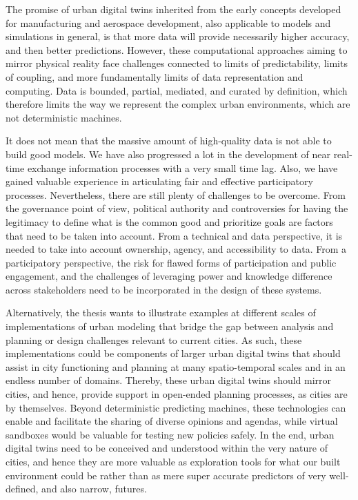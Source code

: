 The promise of urban digital twins inherited from the early concepts developed for manufacturing and aerospace development, also applicable to models and simulations in general, is that more data will provide necessarily higher accuracy, and then better predictions. However, these computational approaches aiming to mirror physical reality face challenges connected to limits of predictability, limits of coupling, and more fundamentally limits of data representation and computing. Data is bounded, partial, mediated, and curated by definition, which therefore limits the way we represent the complex urban environments, which are not deterministic machines.

It does not mean that the massive amount of high-quality data is not able to build good models. We have also progressed a lot in the development of near real-time exchange information processes with a very small time lag. Also, we have gained valuable experience in articulating fair and effective participatory processes. Nevertheless, there are still plenty of challenges to be overcome. From the governance point of view, political authority and controversies for having the legitimacy to define what is the common good and prioritize goals are factors that need to be taken into account. From a technical and data perspective, it is needed to take into account ownership, agency, and accessibility to data. From a participatory perspective, the risk for flawed forms of participation and public engagement, and the challenges of leveraging power and knowledge difference across stakeholders need to be incorporated in the design of these systems.

Alternatively, the thesis wants to illustrate examples at different scales of implementations of urban modeling that bridge the gap between analysis and planning or design challenges relevant to current cities. As such, these implementations could be components of larger urban digital twins that should assist in city functioning and planning at many spatio-temporal scales and in an endless number of domains. Thereby, these urban digital twins should mirror cities, and hence, provide support in open-ended planning processes, as cities are by themselves. Beyond deterministic predicting machines, these technologies can enable and facilitate the sharing of diverse opinions and agendas, while virtual sandboxes would be valuable for testing new policies safely. In the end, urban digital twins need to be conceived and understood within the very nature of cities, and hence they are more valuable as exploration tools for what our built environment could be rather than as mere super accurate predictors of very well-defined, and also narrow, futures.

